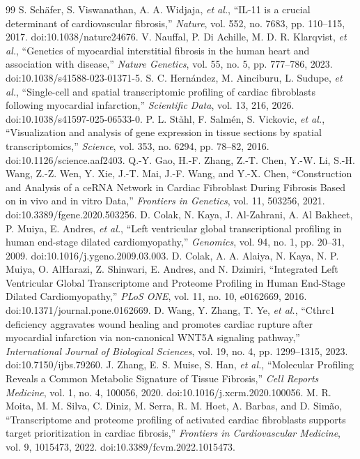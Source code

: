 \documentclass[preprint,11pt]{elsarticle}
\begin{document}
\begin{thebibliography}{99}
 S. Sch\"afer, S. Viswanathan, A. A. Widjaja, \emph{et al.}, ``IL-11 is a crucial determinant of cardiovascular fibrosis,'' \emph{Nature}, vol. 552, no. 7683, pp. 110--115, 2017. doi:10.1038/nature24676.
 V. Nauffal, P. Di Achille, M. D. R. Klarqvist, \emph{et al.}, ``Genetics of myocardial interstitial fibrosis in the human heart and association with disease,'' \emph{Nature Genetics}, vol. 55, no. 5, pp. 777--786, 2023. doi:10.1038/s41588-023-01371-5.
 S. C. Hern\'andez, M. Ainciburu, L. Sudupe, \emph{et al.}, ``Single-cell and spatial transcriptomic profiling of cardiac fibroblasts following myocardial infarction,'' \emph{Scientific Data}, vol. 13, 216, 2026. doi:10.1038/s41597-025-06533-0.
 P. L. St\r{a}hl, F. Salm\'en, S. Vickovic, \emph{et al.}, ``Visualization and analysis of gene expression in tissue sections by spatial transcriptomics,'' \emph{Science}, vol. 353, no. 6294, pp. 78--82, 2016. doi:10.1126/science.aaf2403.
 Q.-Y. Gao, H.-F. Zhang, Z.-T. Chen, Y.-W. Li, S.-H. Wang, Z.-Z. Wen, Y. Xie, J.-T. Mai, J.-F. Wang, and Y.-X. Chen, ``Construction and Analysis of a ceRNA Network in Cardiac Fibroblast During Fibrosis Based on in vivo and in vitro Data,'' \emph{Frontiers in Genetics}, vol. 11, 503256, 2021. doi:10.3389/fgene.2020.503256.
 D. Colak, N. Kaya, J. Al-Zahrani, A. Al Bakheet, P. Muiya, E. Andres, \emph{et al.}, ``Left ventricular global transcriptional profiling in human end-stage dilated cardiomyopathy,'' \emph{Genomics}, vol. 94, no. 1, pp. 20--31, 2009. doi:10.1016/j.ygeno.2009.03.003.
 D. Colak, A. A. Alaiya, N. Kaya, N. P. Muiya, O. AlHarazi, Z. Shinwari, E. Andres, and N. Dzimiri, ``Integrated Left Ventricular Global Transcriptome and Proteome Profiling in Human End-Stage Dilated Cardiomyopathy,'' \emph{PLoS ONE}, vol. 11, no. 10, e0162669, 2016. doi:10.1371/journal.pone.0162669.
 D. Wang, Y. Zhang, T. Ye, \emph{et al.}, ``Cthrc1 deficiency aggravates wound healing and promotes cardiac rupture after myocardial infarction via non-canonical WNT5A signaling pathway,'' \emph{International Journal of Biological Sciences}, vol. 19, no. 4, pp. 1299--1315, 2023. doi:10.7150/ijbs.79260.
 J. Zhang, E. S. Muise, S. Han, \emph{et al.}, ``Molecular Profiling Reveals a Common Metabolic Signature of Tissue Fibrosis,'' \emph{Cell Reports Medicine}, vol. 1, no. 4, 100056, 2020. doi:10.1016/j.xcrm.2020.100056.
 M. R. Moita, M. M. Silva, C. Diniz, M. Serra, R. M. Hoet, A. Barbas, and D. Sim\~ao, ``Transcriptome and proteome profiling of activated cardiac fibroblasts supports target prioritization in cardiac fibrosis,'' \emph{Frontiers in Cardiovascular Medicine}, vol. 9, 1015473, 2022. doi:10.3389/fcvm.2022.1015473.

\end{thebibliography}
\end{document}
